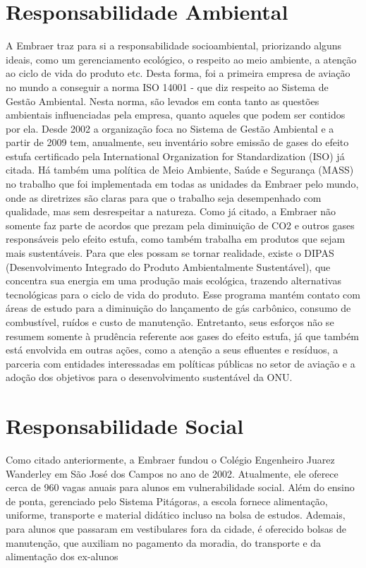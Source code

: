 \section{Responsabilidade Ambiental}
A Embraer traz para si a responsabilidade socioambiental, priorizando alguns ideais, como um gerenciamento ecológico, o respeito ao meio ambiente, a atenção ao ciclo de vida do produto etc. Desta forma, foi a primeira empresa de aviação no mundo a conseguir a norma ISO 14001 - que diz respeito ao Sistema de Gestão Ambiental. Nesta norma, são levados em conta tanto as questões ambientais influenciadas pela empresa, quanto aqueles que podem ser contidos por ela. Desde 2002 a organização foca no Sistema de Gestão Ambiental e a partir de 2009 tem, anualmente, seu inventário sobre emissão de gases do efeito estufa certificado pela International Organization for Standardization (ISO) já citada. Há também uma política de Meio Ambiente, Saúde e Segurança (MASS) no trabalho que foi implementada em todas as unidades da Embraer pelo mundo, onde as diretrizes são claras para que o trabalho seja desempenhado com qualidade, mas sem desrespeitar a natureza.
Como já citado, a Embraer não somente faz parte de acordos que prezam pela diminuição de CO2 e outros gases responsáveis pelo efeito estufa, como também trabalha em produtos que sejam mais sustentáveis. Para que eles possam se tornar realidade, existe o DIPAS (Desenvolvimento Integrado do Produto Ambientalmente Sustentável), que concentra sua energia em uma produção mais ecológica, trazendo alternativas tecnológicas para o ciclo de vida do produto. Esse programa mantém contato com áreas de estudo para a diminuição do lançamento de gás carbônico, consumo de combustível, ruídos e custo de manutenção.
Entretanto, seus esforços não se resumem somente à prudência referente aos gases do efeito estufa, já que também está envolvida em outras ações, como a atenção a seus efluentes e resíduos, a parceria com entidades interessadas em políticas públicas no setor de aviação e a adoção dos objetivos para o desenvolvimento sustentável da ONU.

\section{Responsabilidade Social}
Como citado anteriormente, a Embraer fundou o Colégio Engenheiro Juarez Wanderley em São José dos Campos no ano de 2002. Atualmente, ele oferece cerca de 960 vagas anuais para alunos em vulnerabilidade social. Além do ensino de ponta, gerenciado pelo Sistema Pitágoras, a escola fornece alimentação, uniforme, transporte e material didático incluso na bolsa de estudos. Ademais, para alunos que passaram em vestibulares fora da cidade, é oferecido bolsas de manutenção, que auxiliam no pagamento da moradia, do transporte e da alimentação dos ex-alunos


